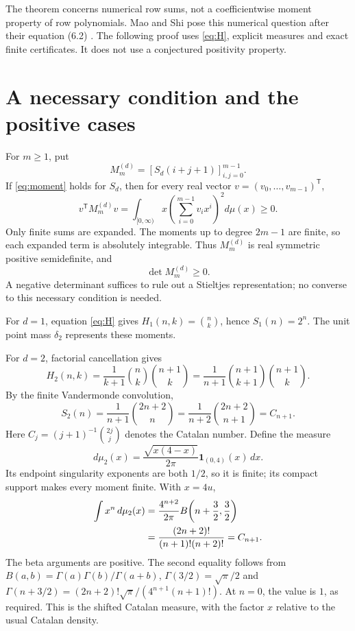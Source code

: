 \documentclass[11pt]{article}
\begin{document}
The theorem concerns numerical row sums, not a coefficientwise
moment property of row polynomials. Mao and Shi pose this numerical
question after their equation (6.2) \cite[Section 6]{MS}.
The following proof uses \eqref{eq:H}, explicit measures and exact
finite certificates. It does not use a conjectured positivity property.

\section{A necessary condition and the positive cases}

For $m\geq1$, put
\begin{equation}\label{eq:shifted-Hankel}
 M_m^{(d)}=[S_d(i+j+1)]_{i,j=0}^{m-1}.
\end{equation}
If \eqref{eq:moment} holds for $S_d$, then for every real vector
$v=(v_0,\ldots,v_{m-1})^{\mathsf T}$,
\begin{equation}\label{eq:Gram}
 v^{\mathsf T}M_m^{(d)}v
 =\int_{[0,\infty)}x
       \left(\sum_{i=0}^{m-1}v_i x^i\right)^2d\mu(x)\geq0.
\end{equation}
Only finite sums are expanded. The moments up to degree $2m-1$
are finite, so each expanded term is absolutely integrable.
Thus $M_m^{(d)}$ is real symmetric positive semidefinite, and
\begin{equation}\label{eq:necessary-det}
 \det M_m^{(d)}\geq0.
\end{equation}
A negative determinant suffices to rule out a Stieltjes representation;
no converse to this necessary condition is needed.

For $d=1$, equation \eqref{eq:H} gives $H_1(n,k)=\binom nk$, hence
$S_1(n)=2^n$. The unit point mass $\delta_2$ represents these moments.

For $d=2$, factorial cancellation gives
\[
 H_2(n,k)=\frac{1}{k+1}\binom nk\binom{n+1}{k}
 =\frac{1}{n+1}\binom{n+1}{k+1}\binom{n+1}{k}.
\]
By the finite Vandermonde convolution,
\begin{equation}\label{eq:Catalan-shift}
 S_2(n)=\frac{1}{n+1}\binom{2n+2}{n}
       =\frac{1}{n+2}\binom{2n+2}{n+1}=C_{n+1}.
\end{equation}
Here $C_j=(j+1)^{-1}\binom{2j}{j}$ denotes the Catalan number.
Define the measure
\begin{equation}\label{eq:positive-measure}
 d\mu_2(x)=\frac{\sqrt{x(4-x)}}{2\pi}
               \mathbf1_{(0,4)}(x)\,dx.
\end{equation}
Its endpoint singularity exponents are both $1/2$, so it is finite;
its compact support makes every moment finite. With $x=4u$,
\begin{align}
 \int x^n\,d\mu_2(x)
 &=\frac{4^{n+2}}{2\pi}
          B\!\left(n+\frac32,\frac32\right)\notag\\
 &=\frac{(2n+2)!}{(n+1)!(n+2)!}=C_{n+1}.\label{eq:beta}
\end{align}
The beta arguments are positive. The second equality follows from
$B(a,b)=\Gamma(a)\Gamma(b)/\Gamma(a+b)$,
$\Gamma(3/2)=\sqrt\pi/2$ and
$\Gamma(n+3/2)=(2n+2)!\sqrt\pi/(4^{n+1}(n+1)!)$.
At $n=0$, the value is $1$, as required. This is the shifted Catalan
measure, with the factor $x$ relative to the usual Catalan density.
\end{document}
